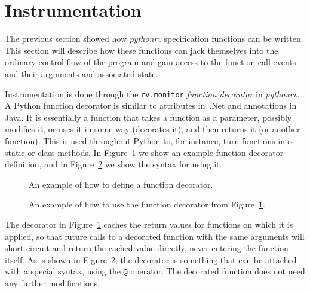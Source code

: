 \section{Instrumentation} \label{section-approach-instrumentation}

The previous section showed how \textit{pythonrv} specification functions can
be written. This section will describe how these functions can jack themselves
into the ordinary control flow of the program and gain access to the function
call events and their arguments and associated state.

Instrumentation is done through the \texttt{rv.monitor} \textit{function
decorator} in \textit{pythonrv}. A Python function decorator is similar to
attributes in~.Net and annotations in Java. It is essentially a function that
takes a function as a parameter, possibly modifies it, or uses it in some way
(decorates it), and then returns it (or another function). This is used
throughout Python to, for instance, turn functions into static or class
methods. In Figure~\ref{figure-function-decorator} we show an example function
decorator definition, and in Figure~\ref{figure-function-decorator-usages} we
show the syntax for using it.

\begin{figure}[h!]
	\begin{center}
	\begin{minipage}{0.7\textwidth}
	
	\end{minipage}
	\end{center}

	\caption{An example of how to define a function decorator.}
	\label{figure-function-decorator}
\end{figure}

\begin{figure}[h!]
	\begin{center}
	\begin{minipage}{0.7\textwidth}
	
	\end{minipage}
	\end{center}

	\caption{An example of how to use the function decorator from
	Figure~\ref{figure-function-decorator}.}
	\label{figure-function-decorator-usages}
\end{figure}

The decorator in Figure~\ref{figure-function-decorator} caches the return
values for functions on which it is applied, so that future calls to a
decorated function with the same arguments will short-circuit and return the
cached value directly, never entering the function itself. As is shown in
Figure~\ref{figure-function-decorator-usages}, the decorator is something that
can be attached with a special syntax, using the \texttt{@} operator. The
decorated function does not need any further modifications.


